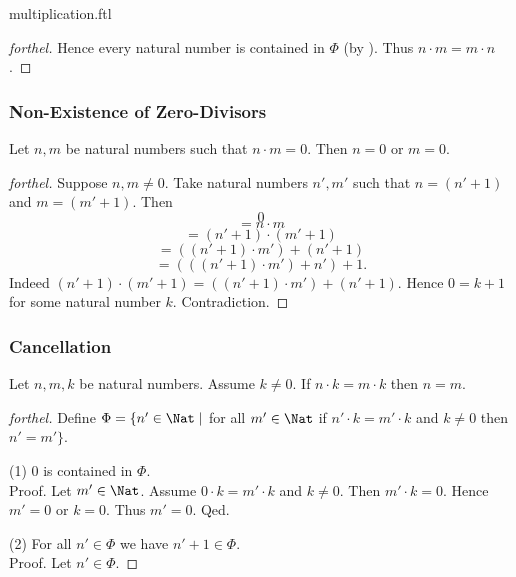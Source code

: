 \documentclass{naproche-library}
\begin{document}
\begin{smodule}{multiplication.ftl}
\begin{proof}[forthel]
    Hence every natural number is contained in $\Phi$ (by ).
    Thus $n \cdot m = m \cdot n$.
  \end{proof}


  \subsubsection*{Non-Existence of Zero-Divisors}

  \begin{proposition}[forthel,id=ARITHMETIC_06_3843962875936768,printid]
    Let $n, m$ be natural numbers such that $n \cdot m = 0$.
    Then $n = 0$ or $m = 0$.
  \end{proposition}
  \begin{proof}[forthel]
    Suppose $n, m \neq 0$.
    Take natural numbers $n', m'$ such that $n = (n' + 1)$ and $m = (m' + 1)$.
    Then
    \[  0                                     \]
    \[    = n \cdot m                         \]
    \[    = (n' + 1) \cdot (m' + 1)           \]
    \[    = ((n' + 1) \cdot m') + (n' + 1)    \]
    \[    = (((n' + 1) \cdot m') + n') + 1.   \]
    Indeed $(n' + 1) \cdot (m' + 1) = ((n' + 1) \cdot m') + (n' + 1)$.
    Hence $0 = k + 1$ for some natural number $k$.
    Contradiction.
  \end{proof}


  \subsubsection*{Cancellation}

  \begin{proposition}[forthel,id=ARITHMETIC_06_31055184658432,printid]
    Let $n, m, k$ be natural numbers.
    Assume $k \neq 0$.
    If $n \cdot k = m \cdot k$ then $n = m$.
  \end{proposition}
  \begin{proof}[forthel]
    Define $\Phi = \{ n' \in \Nat \mid$ for all $m' \in \Nat$ if $n' \cdot k = m' \cdot k$ and $k \neq 0$ then $n' = m' \}$.

    (1) $0$ is contained in $\Phi$. \\
    Proof.
      Let $m' \in \Nat$.
      Assume $0 \cdot k = m' \cdot k$ and $k \neq 0$.
      Then $m' \cdot k = 0$.
      Hence $m' = 0$ or $k = 0$.
      Thus $m' = 0$.
    Qed.

    (2) For all $n' \in \Phi$ we have $n' + 1 \in \Phi$. \\
    Proof.
      Let $n' \in \Phi$.


\end{proof}
\end{smodule}
\end{document}
